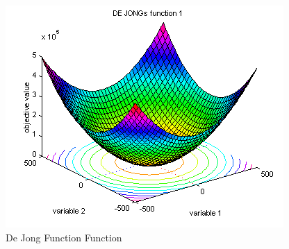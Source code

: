 \documentclass{article}
\begin{document}
\begin{figure}[!h]
  \includegraphics[width=\textwidth,height=\textheight,keepaspectratio]{dejong.png}
  \caption{De Jong Function Function\cite{dejong_img}}
\end{figure}
\end{document}
